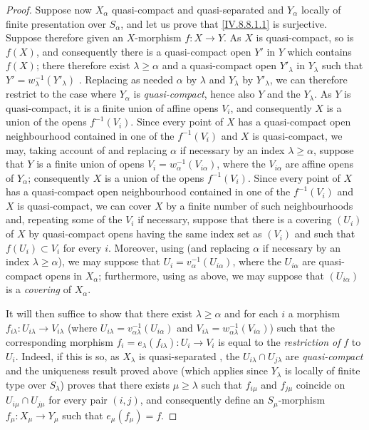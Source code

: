 \begin{proof}
Suppose now $X_\alpha$ quasi-compact and quasi-separated and $Y_\alpha$ locally of finite presentation over $S_\alpha$, and let us prove that \eqref{IV.8.8.1.1} is surjective.
Suppose therefore given an $X$-morphism $f:X\to Y$.
As $X$ is quasi-compact, so is
$f(X)$, and consequently there is a quasi-compact open $Y'$ in $Y$ which contains $f(X)$; there therefore exist $\lambda\geqslant\alpha$ and a quasi-compact open $Y'_\lambda$ in $Y_\lambda$ such that $Y'=w_\lambda^{-1}(Y'_\lambda)$ .
Replacing as needed $\alpha$ by $\lambda$ and $Y_\lambda$ by $Y'_\lambda$, we can therefore restrict to the case where $Y_\alpha$ is \emph{quasi-compact}, hence also $Y$ and the $Y_\lambda$.
As $Y$ is quasi-compact, it is a finite union of affine opens $V_i$, and consequently $X$ is a union of the opens $f^{-1}(V_i)$. Since every point of $X$ has a quasi-compact open neighbourhood contained in one of the $f^{-1}(V_i)$ and $X$ is quasi-compact, we may, taking account of  and replacing $\alpha$ if necessary by an index $\lambda\geqslant\alpha$, suppose that $Y$ is a finite union of opens $V_i=w_\alpha^{-1}(V_{i\alpha})$, where the $V_{i\alpha}$ are affine opens of $Y_\alpha$; consequently $X$ is a union of the opens $f^{-1}(V_i)$. Since every point of $X$ has a quasi-compact open neighbourhood contained in one of the $f^{-1}(V_i)$ and $X$ is quasi-compact, we can cover $X$ by a finite number of such neighbourhoods and, repeating some of the $V_i$ if necessary, suppose that there is a covering $(U_i)$ of $X$ by quasi-compact opens having the same index set as $(V_i)$ and such that $f(U_i)\subset V_i$ for every $i$. Moreover, using  (and replacing $\alpha$ if necessary by an index $\lambda\geqslant\alpha$), we may suppose that $U_i=v_\alpha^{-1}(U_{i\alpha})$, where the $U_{i\alpha}$ are quasi-compact opens in $X_\alpha$; furthermore, using  as above, we may suppose that $(U_{i\alpha})$ is a \emph{covering} of $X_\alpha$.

It will then suffice to show that there exist $\lambda\geqslant\alpha$ and for each $i$ a morphism $f_{i\lambda}:U_{i\lambda}\to V_{i\lambda}$ (where $U_{i\lambda}=v_{\alpha\lambda}^{-1}(U_{i\alpha})$ and $V_{i\lambda}=w_{\alpha\lambda}^{-1}(V_{i\alpha})$) such that the corresponding morphism $f_i=e_\lambda(f_{i\lambda}):U_i\to V_i$ is equal to the \emph{restriction of} $f$ to $U_i$.
Indeed, if this is so, as $X_\lambda$ is quasi-separated , the $U_{i\lambda}\cap U_{j\lambda}$ are \emph{quasi-compact} and the uniqueness result proved above (which applies since $Y_\lambda$ is locally of finite type over $S_\lambda$) proves that there exists $\mu\geqslant\lambda$ such that $f_{i\mu}$ and $f_{j\mu}$ coincide on $U_{i\mu}\cap U_{j\mu}$ for every pair $(i,j)$, and consequently define an $S_\mu$-morphism $f_\mu:X_\mu\to Y_\mu$ such that $e_\mu(f_\mu)=f$.


\end{proof}
